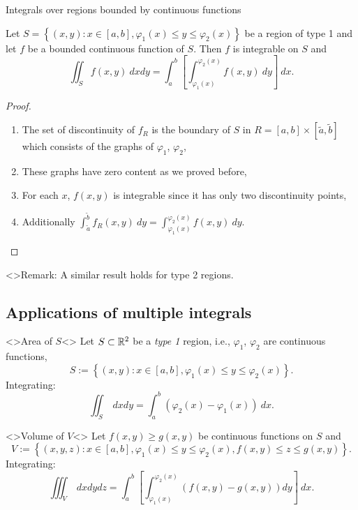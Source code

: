 {Integrals over regions bounded by continuous functions}


\begin{theorem}
    Let \(S = \left\{(x,y): x \in [a,b], \varphi_1(x) \leq y \leq \varphi_2(x)\right\}\) be a region of type 1 and let \(f\) be a bounded continuous function of \(S\).
    Then \(f\) is integrable on \(S\) and
    \[
        \iint_{S} f(x,y) \ dxdy = \int_{a}^{b} \left[\int_{\varphi_1(x)}^{\varphi_2(x)} f(x,y) \ dy\right] \ dx.
    \]
\end{theorem}

\begin{proof}
    \begin{enumerate}
        \item The set of discontinuity of \(f_{R}\) is the boundary of \(S\) in \(R=[a,b]\times[\tilde a,\tilde b]\) which consists of the graphs of \(\varphi_1\), \(\varphi_2\),
        \item These graphs have zero content as we proved before,
        \item For each \(x\), \(f(x,y)\) is integrable since it has only two discontinuity points,
        \item Additionally \(\int_{\tilde a}^{\tilde b} f_{R}(x,y) \ dy =  \int_{\varphi_1(x)}^{\varphi_2(x)} f(x,y) \ dy \). \qedhere
    \end{enumerate}
\end{proof}

<>{Remark:} A similar result holds for type 2 regions.


\subsection{Applications of multiple integrals}



<>{Area of \(S\)}<>
Let    \(S \subset \mathbb{R}^2\)  be a \emph{type 1} region, i.e.,   \(\varphi_1\), \(\varphi_2\) are continuous functions,
\[
    S := \left\{(x,y): x \in [a,b], \varphi_1(x) \leq y \leq \varphi_2(x)\right\}.
\]
Integrating:
\[
    \iint_{S} \ dx dy = \int_{a}^{b}( \varphi_2(x) - \varphi_1(x)) \ dx.
\]


<>{Volume of \(V\)}<>
Let \(f(x,y) \geq g(x,y)\) be continuous functions on \(S\) and
\[
    V := \left\{ (x,y,z) :  x \in [a,b], \varphi_1(x) \leq y \leq \varphi_2(x), f(x,y) \leq z \leq g(x,y)  \right\}.
\]
Integrating:
\[
    \iiint_{V} \ dxdydz =  \int_{a}^{b}
    \left[ \int_{\varphi_1(x)}^{\varphi_2(x)}   ( f(x,y)  -  g(x,y)) dy \right] \ dx.
\]





